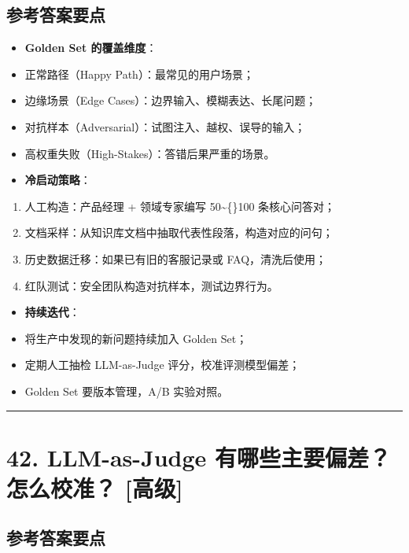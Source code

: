 \documentclass[9pt,a4paper,twocolumn]{ctexart}
\newcommand{\lvgao}{\usebox{\badgegaobox}}
\def\lvgao{[高级]}%
\begin{document}
\subsection*{参考答案要点}

\begin{itemize}[itemsep=1pt, topsep=2pt]
  \item \textbf{Golden Set 的覆盖维度}：
  \item 正常路径（Happy Path）：最常见的用户场景；
  \item 边缘场景（Edge Cases）：边界输入、模糊表达、长尾问题；
  \item 对抗样本（Adversarial）：试图注入、越权、误导的输入；
  \item 高权重失败（High-Stakes）：答错后果严重的场景。
  \item \textbf{冷启动策略}：
\end{itemize}
\begin{enumerate}[itemsep=1pt, topsep=2pt]
  \item 人工构造：产品经理 + 领域专家编写 50\textasciitilde\{\}100 条核心问答对；
  \item 文档采样：从知识库文档中抽取代表性段落，构造对应的问句；
  \item 历史数据迁移：如果已有旧的客服记录或 FAQ，清洗后使用；
  \item 红队测试：安全团队构造对抗样本，测试边界行为。
\end{enumerate}
\begin{itemize}[itemsep=1pt, topsep=2pt]
  \item \textbf{持续迭代}：
  \item 将生产中发现的新问题持续加入 Golden Set；
  \item 定期人工抽检 LLM-as-Judge 评分，校准评测模型偏差；
  \item Golden Set 要版本管理，A/B 实验对照。
\end{itemize}


\vspace{2pt}
\noindent\rule{\columnwidth}{0.3pt}\vspace{2pt}



\section*{42. LLM-as-Judge 有哪些主要偏差？怎么校准？ \lvgao{}}


\subsection*{参考答案要点}
\end{document}
